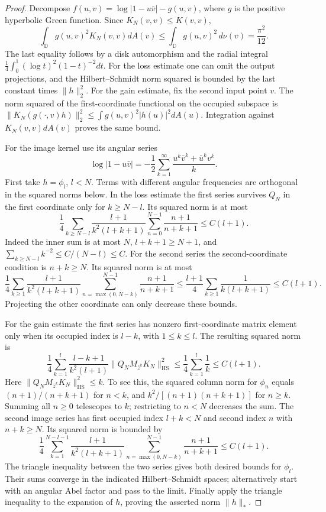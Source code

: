\documentclass[11pt,a4paper]{article}
\numberwithin{equation}{section}
\theoremstyle{definition}
\theoremstyle{remark}
\newcommand{\D}{\mathbb D}
\begin{document}
\begin{proof}
Decompose $f(u,v)=\log|1-u\bar v|-g(u,v)$, where $g$ is the
positive hyperbolic Green function.  Since $K_N(v,v)\le K(v,v)$,
\[
 \int_\D g(u,v)^2K_N(v,v)dA(v)
 \le\int_\D g(u,v)^2\,d\nu(v)=\frac{\pi^2}{12}.
\]
The last equality follows by a disk automorphism and the radial
integral $\tfrac14\int_0^1(\log t)^2(1-t)^{-2}dt$.
For the loss estimate one can omit the output projections, and
the Hilbert--Schmidt norm squared is bounded by the last constant
times $\|h\|_2^2$.  For the gain estimate, fix the second input
point $v$.  The norm squared of the first-coordinate functional
on the occupied subspace is
$\|K_N(g(\cdot,v)h)\|_2^2\le\int g(u,v)^2|h(u)|^2dA(u)$.
Integration against $K_N(v,v)dA(v)$ proves the same bound.

For the image kernel use its angular series
\[
 \log|1-u\bar v|=-\frac12\sum_{k=1}^\infty
             \frac{u^k\bar v^k+\bar u^kv^k}{k}.
\]
First take $h=\phi_l$, $l<N$.  Terms with different angular
frequencies are orthogonal in the squared norms below.  In the
loss estimate the first series survives $Q_N$ in the first
coordinate only for $k\ge N-l$.  Its squared norm is at most
\[
 \frac14\sum_{k\ge N-l}\frac{l+1}{k^2(l+k+1)}
       \sum_{n=0}^{N-1}\frac{n+1}{n+k+1}
 \le C(l+1).
\]
Indeed the inner sum is at most $N$, $l+k+1\ge N+1$, and
$\sum_{k\ge N-l}k^{-2}\le C/(N-l)\le C$.
For the second series the second-coordinate condition is
$n+k\ge N$.  Its squared norm is at most
\[
 \frac14\sum_{k\ge1}\frac{l+1}{k^2(l+k+1)}
        \sum_{n=\max(0,N-k)}^{N-1}\frac{n+1}{n+k+1}
 \le\frac{l+1}{4}\sum_{k\ge1}\frac1{k(l+k+1)}
 \le C(l+1).
\]
Projecting the other coordinate can only decrease these bounds.

For the gain estimate the first series has nonzero first-coordinate
matrix element only when its occupied index is $l-k$, with
$1\le k\le l$.  The resulting squared norm is
\[
 \frac14\sum_{k=1}^l\frac{l-k+1}{k^2(l+1)}
             \|Q_NM_{\bar z^k}K_N\|_{\mathrm{HS}}^2
 \le\frac14\sum_{k=1}^l\frac1k\le C(l+1).
\]
Here $\|Q_NM_{\bar z^k}K_N\|_{\mathrm{HS}}^2\le k$.
To see this, the squared column norm for $\phi_n$ equals
$(n+1)/(n+k+1)$ for $n<k$, and
$k^2/[(n+1)(n+k+1)]$ for $n\ge k$.  Summing all $n\ge0$
telescopes to $k$; restricting to $n<N$ decreases the sum.
The second image series has first occupied index $l+k<N$ and
second index $n$ with $n+k\ge N$.  Its squared norm is bounded by
\[
 \frac14\sum_{k=1}^{N-l-1}\frac{l+1}{k^2(l+k+1)}
       \sum_{n=\max(0,N-k)}^{N-1}\frac{n+1}{n+k+1}
 \le C(l+1).
\]
The triangle inequality between the two series gives both desired
bounds for $\phi_l$.  Their sums converge in the indicated
Hilbert--Schmidt spaces; alternatively start with an angular
Abel factor and pass to the limit.  Finally apply the triangle
inequality to the expansion of $h$, proving the asserted norm
$\|h\|_*$.
\end{proof}
\end{document}
